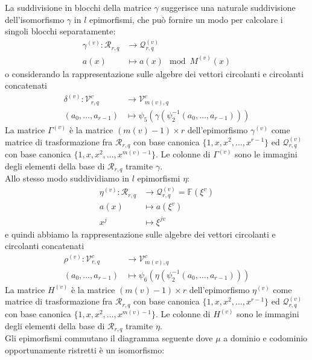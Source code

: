 La suddivisione in blocchi della matrice $\gamma$ suggerisce una naturale suddivisione dell'isomorfismo $\gamma$ in $l$ epimorfismi, che può fornire un modo per calcolare i singoli blocchi separatamente:
\begin{align*}
  \gamma^{(v)} :  \mathcal{R}_{r,q}    
  & \longrightarrow  
  \mathcal{Q}_{r,q}^{(v)}  \\
  a(x) 
  &\longmapsto  
  a(x) \mod{M^{(v)}(x)}
\end{align*}
o considerando la rappresentazione sulle algebre dei vettori circolanti e circolanti concatenati
\begin{align*}
  \delta^{(v)} :  \mathcal{V}_{r, q}^{c}     
  & \longrightarrow  
  \mathcal{V}_{m(v), q}^{c}   \\
  ( a_0, \dots , a_{r-1} ) 
  &\longmapsto  
  \psi_{5} ( \gamma ( \psi_{2}^{-1} ( a_0, \dots , a_{r-1} )))  
\end{align*}
La matrice $\Gamma^{(v)}$ è la matrice $(m(v)-1)\times r$ dell'epimorfismo $\gamma^{(v)}$ come matrice di trasformazione fra $\mathcal{R}_{r,q}$ con base canonica $\lbrace 1,x,x^2, \dots , x^{r-1}\rbrace$ ed $\mathcal{Q}_{r,q}^{(v)}$ con base canonica $\lbrace 1,x,x^2, \dots , x^{m(v)-1}\rbrace$. Le colonne di $\Gamma^{(v)}$ sono le immagini degli elementi della base di $\mathcal{R}_{r,q}$ tramite $\gamma$. \\
Allo stesso modo suddividiamo in $l$ epimorfismi $\eta$:
\begin{align*}
  \eta^{(v)} :  \mathcal{R}_{r,q}    
  & \longrightarrow  
  \mathcal{Q}_{r,q}^{(v)} =  \mathbb{F} (\xi^{v})  \\
  a(x) 
  &\longmapsto  
  a(\xi^{v}) \\
  x^{j}
  &\longmapsto  
  \xi^{jv} 
\end{align*}
e quindi abbiamo la rappresentazione sulle algebre dei vettori circolanti e circolanti concatenati
\begin{align*}
  \rho^{(v)} :  \mathcal{V}_{r, q}^{c}     
  & \longrightarrow  
  \mathcal{V}_{m(v), q}^{c}   \\
  ( a_0, \dots , a_{r-1} ) 
  &\longmapsto  
  \psi_{6} ( \eta ( \psi_{2}^{-1} ( a_0, \dots , a_{r-1} )))  
\end{align*}
La matrice $H^{(v)}$ è la matrice $(m(v)-1)\times r$ dell'epimorfismo $\eta^{(v)}$ come matrice di trasformazione fra $\mathcal{R}_{r,q}$ con base canonica $\lbrace 1,x,x^2, \dots , x^{r-1}\rbrace$ ed $\mathcal{Q}_{r,q}^{(v)}$ con base canonica $\lbrace 1,x,x^2, \dots , x^{m(v)-1}\rbrace$. Le colonne di $H^{(v)}$ sono le immagini degli elementi della base di $\mathcal{R}_{r,q}$ tramite $\eta$. \\
Gli epimorfismi commutano il diagramma seguente dove $\mu$ a dominio e codominio opportunamente ristretti è un isomorfismo:


